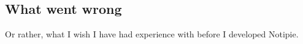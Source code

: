 \subsection{What went wrong}\label{sec:what-went-wrong}

Or rather,
what I wish I have had experience with
before I developed Notipie.
